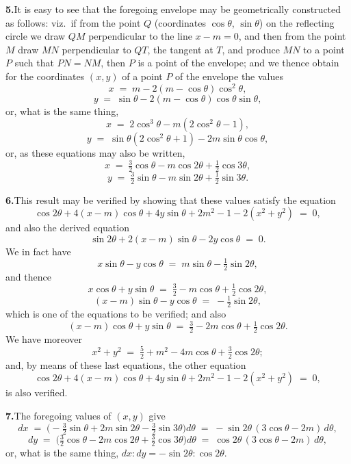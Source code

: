 \documentclass[11pt]{article}
\begin{document}
\textbf{5.}\quad It is easy to see that the foregoing envelope may be geometrically constructed as follows: viz.\ if from the point $Q$ (coordinates $\cos\theta$, $\sin\theta$) on the reflecting circle we draw $QM$ perpendicular to the line $x - m = 0$, and then from the point $M$ draw $MN$ perpendicular to $QT$, the tangent at $T$, and produce $MN$ to a point $P$ such that $PN = NM$, then $P$ is a point of the envelope; and we thence obtain for the coordinates $(x, y)$ of a point $P$ of the envelope the values
\[
x \;=\; m - 2(m - \cos\theta)\cos^{2}\theta,
\]
\[
y \;=\; \sin\theta - 2(m - \cos\theta)\cos\theta\sin\theta,
\]
or, what is the same thing,
\[
x \;=\; 2\cos^{3}\theta - m(2\cos^{2}\theta - 1),
\]
\[
y \;=\; \sin\theta(2\cos^{2}\theta + 1) - 2 m\sin\theta\cos\theta,
\]
or, as these equations may also be written,
\[
x \;=\; \tfrac{3}{2}\cos\theta - m\cos 2\theta + \tfrac{1}{2}\cos 3\theta,
\]
\[
y \;=\; \tfrac{3}{2}\sin\theta - m\sin 2\theta + \tfrac{1}{2}\sin 3\theta.
\]

\textbf{6.}\quad This result may be verified by showing that these values satisfy the equation
\[
\cos 2\theta + 4(x - m)\cos\theta + 4 y\sin\theta + 2 m^{2} - 1 - 2(x^{2} + y^{2}) \;=\; 0,
\]
and also the derived equation
\[
\sin 2\theta + 2(x - m)\sin\theta - 2 y\cos\theta \;=\; 0.
\]
We in fact have
\[
x\sin\theta - y\cos\theta \;=\; m\sin\theta - \tfrac{1}{2}\sin 2\theta,
\]
and thence
\[
x\cos\theta + y\sin\theta \;=\; \tfrac{3}{2} - m\cos\theta + \tfrac{1}{2}\cos 2\theta,
\]
\[
(x - m)\sin\theta - y\cos\theta \;=\; -\tfrac{1}{2}\sin 2\theta,
\]
which is one of the equations to be verified; and also
\[
(x - m)\cos\theta + y\sin\theta \;=\; \tfrac{3}{2} - 2 m\cos\theta + \tfrac{1}{2}\cos 2\theta.
\]
We have moreover
\[
x^{2} + y^{2} \;=\; \tfrac{5}{2} + m^{2} - 4 m\cos\theta + \tfrac{3}{2}\cos 2\theta;
\]
and, by means of these last equations, the other equation
\[
\cos 2\theta + 4(x - m)\cos\theta + 4 y\sin\theta + 2 m^{2} - 1 - 2(x^{2} + y^{2}) \;=\; 0,
\]
is also verified.

\textbf{7.}\quad The foregoing values of $(x, y)$ give
\[
dx \;=\; \bigl(-\tfrac{3}{2}\sin\theta + 2 m\sin 2\theta - \tfrac{3}{2}\sin 3\theta\bigr)d\theta \;=\; -\sin 2\theta\,(3\cos\theta - 2 m)\,d\theta,
\]
\[
dy \;=\; \bigl(\tfrac{3}{2}\cos\theta - 2 m\cos 2\theta + \tfrac{3}{2}\cos 3\theta\bigr)d\theta \;=\; \cos 2\theta\,(3\cos\theta - 2 m)\,d\theta,
\]
or, what is the same thing, $dx : dy = -\sin 2\theta : \cos 2\theta$.
\end{document}
